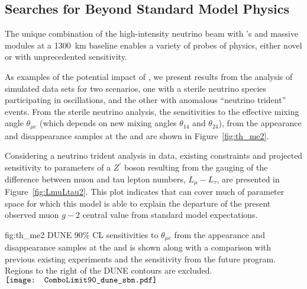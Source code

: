 \subsection{Searches for Beyond Standard Model Physics}


The unique combination of the high-intensity  neutrino beam with
's   and massive   modules at a 
\SI{1300}{\km} baseline enables a variety of probes of  
physics, either novel or with unprecedented sensitivity.

As examples of the potential impact of , we present results from the 
analysis of simulated data sets for two  scenarios, one with 
a sterile neutrino species participating in oscillations, 
and the other with anomalous ``neutrino trident'' events.
%
From the sterile neutrino analysis,  
the  sensitivities to the effective mixing angle $\theta_{\mu e}$
(which depends on new mixing angles $\theta_{14}$ and $\theta_{24}$), from the appearance and disappearance samples at the  and  are shown in Figure~\ref{fig:th_me2}. 
%

Considering a neutrino trident analysis in  data, 
existing constraints and projected sensitivity to parameters of a $Z^\prime$ boson resulting from the gauging of the difference between 
muon and tau lepton numbers, $L_\mu - L_\tau$, are presented 
in Figure~\ref{fig:LmuLtau2}.  This plot indicates that  
can cover much of parameter space for which this model is 
able to explain the 
departure of the present observed muon $g-2$ central value 
from standard model expectations.


\begin{dunefigure}
{fig:th_me2}
{DUNE 90\% CL sensitivities to $\theta_{\mu e}$ from the appearance and disappearance samples at the  and  is shown along with a comparison with previous existing experiments and the sensitivity from the future  program. Regions to the right of the DUNE contours are excluded.}
$\vcenter{\hbox{\texttt{[image: ComboLimit90\_dune\_sbn.pdf]}}}$
\end{dunefigure}

